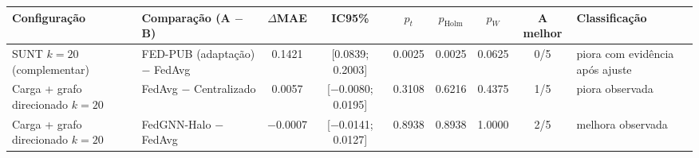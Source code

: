 
\begin{tabular}{>{\raggedright\arraybackslash}l>{\raggedright\arraybackslash}p{3.3cm}cccccc>{\raggedright\arraybackslash}p{3.3cm}}
\toprule
Configuração & Comparação (A $-$ B) & $\Delta$MAE & IC95\% & $p_t$ & $p_{\mathrm{Holm}}$ & $p_W$ & A melhor & Classificação \\
\midrule
SUNT $k=20$ (complementar) & FED-PUB (adaptação) − FedAvg & \num{+0.1421} & [\num{+0.0839}; \num{+0.2003}] & \num{0.0025} & \num{0.0025} & \num{0.0625} & 0/5 & piora com evidência após ajuste \\
Carga + grafo direcionado $k=20$ & FedAvg − Centralizado & \num{+0.0057} & [\num{-0.0080}; \num{+0.0195}] & \num{0.3108} & \num{0.6216} & \num{0.4375} & 1/5 & piora observada \\
Carga + grafo direcionado $k=20$ & FedGNN-Halo − FedAvg & \num{-0.0007} & [\num{-0.0141}; \num{+0.0127}] & \num{0.8938} & \num{0.8938} & \num{1.0000} & 2/5 & melhora observada \\
\bottomrule
\end{tabular}
